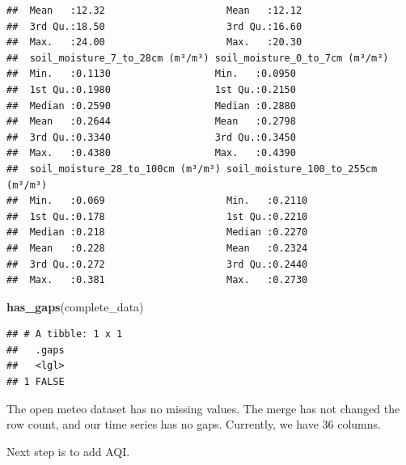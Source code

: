 \documentclass[
]{article}
\newenvironment{Shaded}{\begin{snugshade}}{\end{snugshade}}
\newcommand{\FunctionTok}[1]{\textcolor[rgb]{0.13,0.29,0.53}{\textbf{#1}}}
\newcommand{\NormalTok}[1]{#1}
\begin{document}
\begin{verbatim}
##  Mean   :12.32                     Mean   :12.12                     
##  3rd Qu.:18.50                     3rd Qu.:16.60                     
##  Max.   :24.00                     Max.   :20.30                     
##  soil_moisture_7_to_28cm (m³/m³) soil_moisture_0_to_7cm (m³/m³)
##  Min.   :0.1130                  Min.   :0.0950                
##  1st Qu.:0.1980                  1st Qu.:0.2150                
##  Median :0.2590                  Median :0.2880                
##  Mean   :0.2644                  Mean   :0.2798                
##  3rd Qu.:0.3340                  3rd Qu.:0.3450                
##  Max.   :0.4380                  Max.   :0.4390                
##  soil_moisture_28_to_100cm (m³/m³) soil_moisture_100_to_255cm (m³/m³)
##  Min.   :0.069                     Min.   :0.2110                    
##  1st Qu.:0.178                     1st Qu.:0.2210                    
##  Median :0.218                     Median :0.2270                    
##  Mean   :0.228                     Mean   :0.2324                    
##  3rd Qu.:0.272                     3rd Qu.:0.2440                    
##  Max.   :0.381                     Max.   :0.2730
\end{verbatim}

\begin{Shaded}
\begin{Highlighting}[]
\FunctionTok{has\_gaps}\NormalTok{(complete\_data)}
\end{Highlighting}
\end{Shaded}

\begin{verbatim}
## # A tibble: 1 x 1
##   .gaps
##   <lgl>
## 1 FALSE
\end{verbatim}

The open meteo dataset has no missing values. The merge has not changed
the row count, and our time series has no gaps. Currently, we have 36
columns.

Next step is to add AQI.
\end{document}
